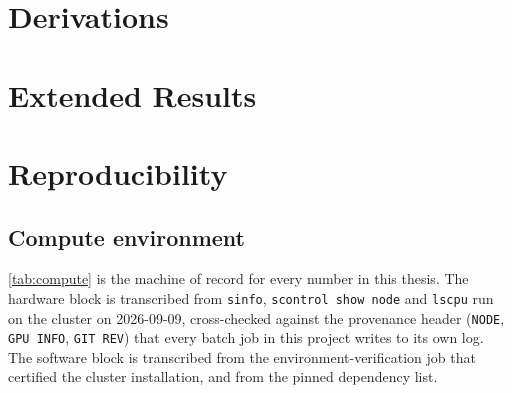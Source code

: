 \appendix{}

\chapter{Derivations}\label{app:derivations}
\chapter{Extended Results}\label{app:results}
\chapter{Reproducibility}\label{app:repro}

\section*{Compute environment}

\autoref{tab:compute} is the machine of record for every number in this thesis. The hardware block
is transcribed from \texttt{sinfo}, \texttt{scontrol show node} and \texttt{lscpu} run on the cluster
on 2026-09-09, cross-checked against the provenance header (\texttt{NODE}, \texttt{GPU INFO},
\texttt{GIT REV}) that every batch job in this project writes to its own log. The software block is
transcribed from the environment-verification job that certified the cluster installation, and from
the pinned dependency list.

